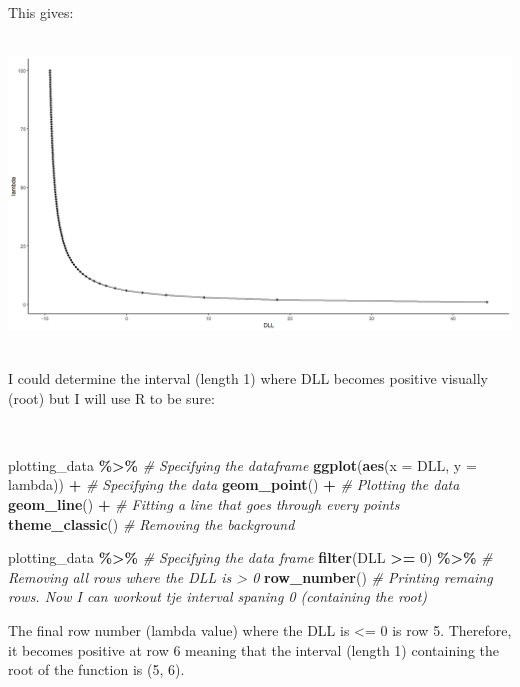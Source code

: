 \documentclass[
]{article}
\newenvironment{Shaded}{\begin{snugshade}}{\end{snugshade}}
\newcommand{\AttributeTok}[1]{\textcolor[rgb]{0.13,0.29,0.53}{#1}}
\newcommand{\CommentTok}[1]{\textcolor[rgb]{0.56,0.35,0.01}{\textit{#1}}}
\newcommand{\DecValTok}[1]{\textcolor[rgb]{0.00,0.00,0.81}{#1}}
\newcommand{\FunctionTok}[1]{\textcolor[rgb]{0.13,0.29,0.53}{\textbf{#1}}}
\newcommand{\NormalTok}[1]{#1}
\newcommand{\SpecialCharTok}[1]{\textcolor[rgb]{0.81,0.36,0.00}{\textbf{#1}}}
\begin{document}
This gives:\\
\strut \\
\includegraphics{images/DLL_function.png}\\
\strut \\
I could determine the interval (length 1) where DLL becomes positive
visually (root) but I will use R to be sure:\\
\strut \\

\begin{Shaded}
\begin{Highlighting}[]
\NormalTok{plotting\_data }\SpecialCharTok{\%\textgreater{}\%}  \CommentTok{\# Specifying the dataframe}
  \FunctionTok{ggplot}\NormalTok{(}\FunctionTok{aes}\NormalTok{(}\AttributeTok{x =}\NormalTok{ DLL, }\AttributeTok{y =}\NormalTok{ lambda)) }\SpecialCharTok{+}  \CommentTok{\# Specifying the data}
  \FunctionTok{geom\_point}\NormalTok{() }\SpecialCharTok{+}  \CommentTok{\# Plotting the  data }
  \FunctionTok{geom\_line}\NormalTok{() }\SpecialCharTok{+}  \CommentTok{\# Fitting a line that goes through every points}
  \FunctionTok{theme\_classic}\NormalTok{()  }\CommentTok{\# Removing the background}

\NormalTok{plotting\_data }\SpecialCharTok{\%\textgreater{}\%}  \CommentTok{\# Specifying the data frame }
  \FunctionTok{filter}\NormalTok{(DLL }\SpecialCharTok{\textgreater{}=}  \DecValTok{0}\NormalTok{) }\SpecialCharTok{\%\textgreater{}\%}  \CommentTok{\# Removing all rows where the DLL is \textgreater{} 0}
  \FunctionTok{row\_number}\NormalTok{()  }\CommentTok{\# Printing remaing rows. Now I can workout tje interval spaning 0 (containing the root)}
\end{Highlighting}
\end{Shaded}

\hfill\break
The final row number (lambda value) where the DLL is \textless= 0 is row
5. Therefore, it becomes positive at row 6 meaning that the interval
(length 1) containing the root of the function is (5, 6).\\
\strut \\
\strut \\
\strut \\
\strut \\
\end{document}
